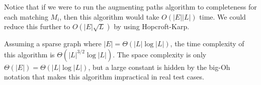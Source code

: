 Notice that if we were to run the augmenting paths algorithm to completeness
for each matching $M_i$, then this algorithm would take $O(|E||L|)$ time. We
could reduce this further to $O(|E|\sqrt{L})$ by using Hopcroft-Karp.
\cite{HopcroftKarp} \vs

Assuming
a sparse graph where $|E|=\Theta(|L|\log|L|)$, the time complexity of this algorithm is $\Theta(|L|^{3/2}\log|L|)$.  The space complexity
is only $\Theta(|E|) = \Theta(|L|\log|L|)$, but a large constant is hidden by
the big-Oh notation that makes this algorithm impractical in real test cases. 